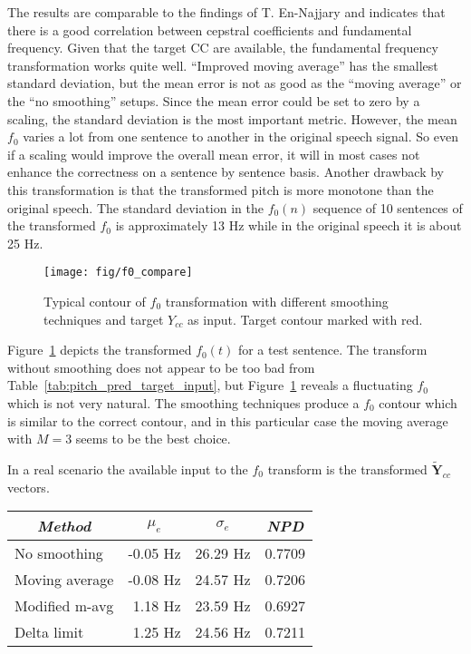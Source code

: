 The results are comparable to the findings of T. En-Najjary \etal \cite{najjary03new} and indicates that there is a good correlation between cepstral coefficients and fundamental frequency. Given that the target CC are available, the fundamental frequency transformation works quite well. ``Improved moving average'' has the smallest standard deviation, but the mean error is not as good as the ``moving average'' or the ``no smoothing'' setups. Since the mean error could be set to zero by a scaling, the standard deviation is the most important metric. However, the mean $f_0$ varies a lot from one sentence to another in the original speech signal. So even if a scaling would improve the overall mean error, it will in most cases not enhance the correctness on a sentence by sentence basis. Another drawback by this transformation is that the transformed pitch is more monotone than the original speech. The standard deviation in the $f_0(n)$ sequence of 10 sentences of the transformed $f_0$ is approximately 13 Hz while in the original speech it is about 25 Hz.

\begin{figure}[htbp]
	\begin{center}
		\texttt{[image: fig/f0\_compare]}
		\caption{Typical contour of $f_0$ transformation with different smoothing techniques and target $Y_{cc}$ as input. Target contour marked with red.}
		\label{fig:pitch_trans}
	\end{center}
\end{figure}
Figure~\ref{fig:pitch_trans} depicts the transformed $f_0(t)$ for a test sentence. The transform without smoothing does not appear to be too bad from Table~\ref{tab:pitch_pred_target_input}, but Figure~\ref{fig:pitch_trans} reveals a fluctuating $f_0$ which is not very natural. The smoothing techniques produce a $f_0$ contour which is similar to the correct contour, and in this particular case the moving average with $M=3$ seems to be the best choice.

In a real scenario the available input to the $f_0$ transform is the transformed $\mathbf{\tilde{Y}}_{cc}$ vectors. 
\begin{table}[htbp]
	\begin{center}
		\label{tab:pitch_pred_transformed_input}	
		\begin{tabular}{lrrr}
			\toprule
			\multicolumn{1}{c}{\emph{Method}} & \multicolumn{1}{c}{$\mu_e$} & \multicolumn{1}{c}{$\sigma_e$} & \multicolumn{1}{c}{\emph{NPD}} \\
			\midrule
			No smoothing & -0.05 Hz  & 26.29 Hz & 0.7709\\
			Moving average & -0.08 Hz  & 24.57 Hz & 0.7206\\
			Modified m-avg & 1.18 Hz & 23.59 Hz & 0.6927\\
			Delta limit & 1.25 Hz & 24.56 Hz & 0.7211 \\
			\bottomrule			
		\end{tabular}		
	\end{center}
\end{table}

